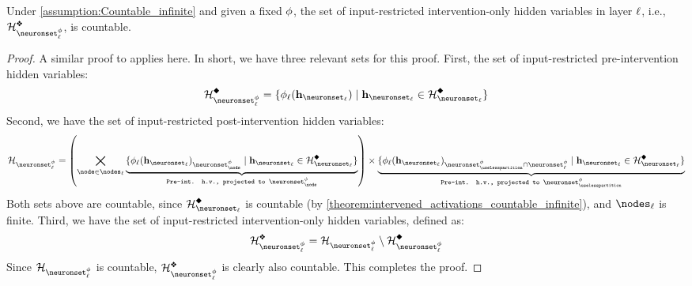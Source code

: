 \begin{lemma}\label{theorem:AllInpIntTransformedActivationsLayerTwoH_countable_infinite}
    Under \cref{assumption:Countable_infinite} and given a fixed $\phi$, the set of input-restricted intervention-only hidden variables in layer $\ell$, i.e., $\AllInpIntTransformedActivationsLayerTwoH{\layer}$, is countable.
\end{lemma}
\begin{proof}
    A similar proof to  applies here.
    In short, we have three relevant sets for this proof.
    First, the set of input-restricted pre-intervention hidden variables:
    \begin{align}
        \AllInpIntTransformedActivationsLayerOneH{\layer}
        = \{
        \causalmap_{\layer}(\hiddenstates_{\neuronset_{\layer}})
        \mid 
        \hiddenstates_{\neuronset_{\layer}} \in \AllInpIntActivationsLayer \}
    \end{align}
    Second, we have the set of input-restricted post-intervention hidden variables:
    \begin{align}
        \AllInpIntTransformedActivationsLayer
        = \left(\bigtimes_{\node \in \nodes_{\layer}} 
        \underbrace{\{
        \causalmap_{\layer}(\hiddenstates_{\neuronset_{\layer}})_{\neuronset^{\causalmap}_{\node}}
        \mid 
        \hiddenstates_{\neuronset_{\layer}} \in \AllInpIntActivationsLayer \}}_{\texttt{Pre-int. h.v., projected to }\neuronset^{\causalmap}_{\node}}\right) 
        \times 
        \underbrace{\{\causalmap_{\layer}(\hiddenstates_{\neuronset_{\layer}})_{\neuronset^{\causalmap}_{\uselesspartition} \cap \neuronset^{\causalmap}_{\layer}}
        \mid 
        \hiddenstates_{\neuronset_{\layer}} \in \AllInpIntActivationsLayer \}}_{\texttt{Pre-int. h.v., projected to }\neuronset^{\causalmap}_{\uselesspartition}}
    \end{align}
    Both sets above are countable, since $\AllInpIntActivationsLayer$ is countable (by \cref{theorem:intervened_activations_countable_infinite}), and $\nodes_{\layer}$ is finite.
    Third, we have the set of input-restricted intervention-only hidden variables, defined as:
    \begin{align}
        \AllInpIntTransformedActivationsLayerTwoH{\layer}
        = 
        \AllInpIntTransformedActivationsLayer
        \setminus
        \AllInpIntTransformedActivationsLayerOneH{\layer}
    \end{align}
    Since $\AllInpIntTransformedActivationsLayer$ is countable, $\AllInpIntTransformedActivationsLayerTwoH{\layer}$ is clearly also countable.
    This completes the proof.
\end{proof}

